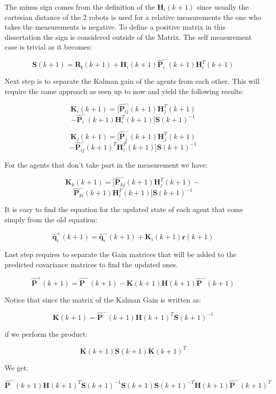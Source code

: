 \documentclass[conference]{IEEEtran}
\begin{document}
The minus sign comes from the definition of the $\mathbf{H}_{i}(k+1)$ since usually the cartesian distance of the 2 robots is used for a relative measurements the one who takes the measurements is negative. To define a positive matrix in this dissertation the sign is considered outside of the Matrix.
The self measurement case is trivial as it becomes:

$$ \mathbf{S}(k+1) = \mathbf{R_{i}}(k+1) + \mathbf{H}_{i}(k+1)\mathbf{\hat{P}}_{i}^{-}(k+1)\mathbf{H}_{i}^{T}(k+1)$$

Next step is to separate the Kalman gain of the agents from each other. This will require the same approach as seen up to now and yield the following results:

$$\mathbf{K}_{i}(k+1) = [\mathbf{\hat{P}}_{ij}^{-}(k+1)\mathbf{H}_{j}^{T}(k+1)$$
$$-\mathbf{\hat{P}}_{i}^{-}(k+1)\mathbf{H}_{i}^{T}(k+1)]\mathbf{S}(k+1)^{-1}$$

$$\mathbf{K}_{j}(k+1) = [\mathbf{\hat{P}}_{j}^{-}(k+1)\mathbf{H}_{j}^{T}(k+1)$$
$$-\mathbf{\hat{P}}_{ij}^{-}(k+1)^{T}\mathbf{H}_{i}^{T}(k+1)]\mathbf{S}(k+1)^{-1}$$

For the agents that don't take part in the measurement we have:

$$\mathbf{K}_{k}(k+1) = [\mathbf{\hat{P}}_{kj}^{-}(k+1)\mathbf{H}_{j}^{T}(k+1)-$$
$$\mathbf{\hat{P}}_{ki}^{-}(k+1)\mathbf{H}_{i}^{T}(k+1)]\mathbf{S}(k+1)^{-1}$$

It is easy to find the equation for the updated state of each agent that come simply from the old equation:

$$ \mathbf{\hat{q}}_{i}^{+}(k+1) = \mathbf{\hat{q}}_{i}^{-}(k+1) + \mathbf{K}_{i}(k+1)\mathbf{r}(k+1) $$

Last step requires to separate the Gain matrices that will be added to the predicted covariance matrices to find the updated ones.

$$\mathbf{\hat{ P}}^{+}(k+1) = \mathbf{\hat{P}}^{-}(k+1) -  \mathbf{K}(k+1)\mathbf{H}(k+1) \mathbf{\hat{P}}^{-}(k+1) $$

Notice that since the matrix of the Kalman Gain is written as:

$$\mathbf{K}(k+1) = \mathbf{\hat{P}^{-}}(k+1)\mathbf{H}(k+1)^{T}\mathbf{S}(k+1)^{-1}$$ 

if we perform the product:

$$\mathbf{K}(k+1)\mathbf{S}(k+1)\mathbf{K}(k+1)^{T}$$ 

We get:

$$\mathbf{\hat{P}^{-}}(k+1)\mathbf{H}(k+1)^{T}\mathbf{S}(k+1)^{-1}\mathbf{S}(k+1)\mathbf{S}(k+1)^{-T}\mathbf{H}(k+1)\mathbf{\hat{P}}^{-}(k+1)^{T}$$
\end{document}
